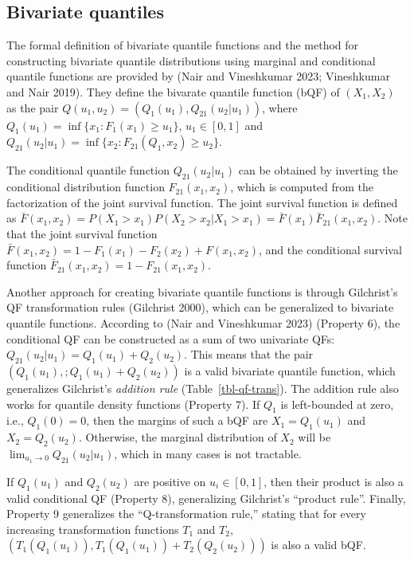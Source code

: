 \documentclass[
]{interact}
\begin{document}
\subsection{Bivariate quantiles}\label{bivariate-quantiles}

The formal definition of bivariate quantile functions and the method for
constructing bivariate quantile distributions using marginal and
conditional quantile functions are provided by (Nair and Vineshkumar
2023; Vineshkumar and Nair 2019). They define the bivarate quantile
function (bQF) of \((X_1, X_2)\) as the pair
\(Q(u_1, u_2)=(Q_1(u_1), Q_{21}(u_2\vert u_1))\), where
\(Q_1(u_1)=\inf \{x_1: F_1(x_1)\geq u_1\}\), \(u_1\in[0,1]\) and
\(Q_{21}(u_2\vert u_1)=\inf\{x_2: F_{21}(Q_1, x_2)\geq u_2\}\).

The conditional quantile function \(Q_{21}(u_2\vert u_1)\) can be
obtained by inverting the conditional distribution function
\(F_{21}(x_1, x_2)\), which is computed from the factorization of the
joint survival function. The joint survival function is defined as
\(\bar{F}(x_1, x_2)=P(X_1> x_1)P(X_2> x_2 \vert X_1 > x_1)= \bar{F}(x_1)\bar{F}_{21}(x_1,x_2)\).
Note that the joint survival function
\(\bar{F}(x_1,x_2)=1-F_1(x_1)-F_2(x_2)+F(x_1,x_2)\), and the conditional
survival function \(\bar{F}_{21}(x_1,x_2)=1-F_{21}(x_1,x_2)\).

Another approach for creating bivariate quantile functions is through
Gilchrist's QF transformation rules (Gilchrist 2000), which can be
generalized to bivariate quantile functions. According to (Nair and
Vineshkumar 2023) (Property 6), the conditional QF can be constructed as
a sum of two univariate QFs:
\(Q_{21}(u_2\vert u_1) = Q_1(u_1) + Q_2(u_2)\). This means that the pair
\((Q_1(u_1), ; Q_1(u_1) + Q_2(u_2))\) is a valid bivariate quantile
function, which generalizes Gilchrist's \emph{addition rule}
(Table~\ref{tbl-qf-trans}). The addition rule also works for quantile
density functions (Property 7). If \(Q_1\) is left-bounded at zero,
i.e., \(Q_1(0) = 0\), then the margins of such a bQF are
\(X_1 = Q_1(u_1)\) and \(X_2 = Q_2(u_2)\). Otherwise, the marginal
distribution of \(X_2\) will be
\(\lim_{u_1 \rightarrow 0}Q_{21}(u_2\vert u_1)\), which in many cases is
not tractable.

If \(Q_1(u_1)\) and \(Q_2(u_2)\) are positive on \(u_i \in [0,1]\), then
their product is also a valid conditional QF (Property 8), generalizing
Gilchrist's ``product rule''. Finally, Property 9 generalizes the
``Q-transformation rule,'' stating that for every increasing
transformation functions \(T_1\) and \(T_2\),
\(\left(T_1(Q_1(u_1)), T_1(Q_1(u_1)) + T_2(Q_2(u_2))\right)\) is also a
valid bQF.
\end{document}
